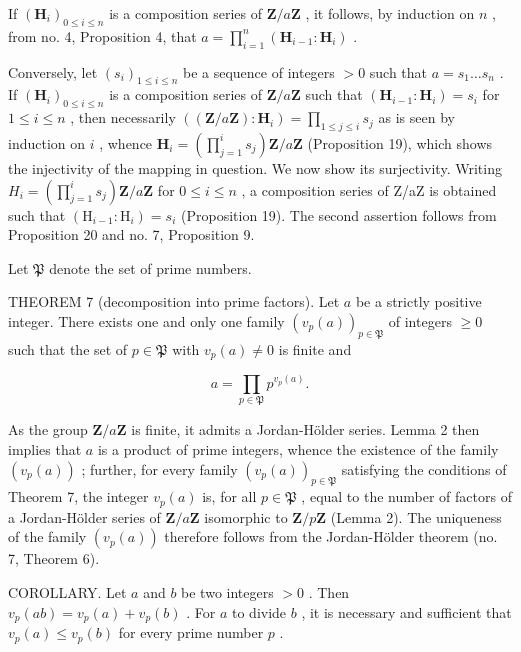 If \((\mathbf{H}_i)_{0\leqslant i\leqslant n}\) is a composition series of \(\mathbf{Z} / a\mathbf{Z}\) , it follows, by induction on \(n\) , from no. 4, Proposition 4, that \(a = \prod_{i=1}^{n} (\mathbf{H}_{i-1}:\mathbf{H}_i)\) .

Conversely, let \((s_i)_{1 \leqslant i \leqslant n}\) be a sequence of integers \(>0\) such that \(a = s_1 \ldots s_n\) . If \((\mathbf{H}_i)_{0 \leqslant i \leqslant n}\) is a composition series of \(\mathbf{Z} / a\mathbf{Z}\) such that \((\mathbf{H}_{i-1} : \mathbf{H}_i) = s_i\) for \(1 \leqslant i \leqslant n\) , then necessarily \(((\mathbf{Z} / a\mathbf{Z}) : \mathbf{H}_i) = \prod_{1 \leqslant j \leqslant i} s_j\) as is seen by induction on \(i\) , whence \(\mathbf{H}_i = \left( \prod_{j=1}^{i} s_j \right) \mathbf{Z} / a\mathbf{Z}\) (Proposition 19), which shows the injectivity of the mapping in question. We now show its surjectivity. Writing \(H_{i}=\left(\prod_{j=1}^{i}s_{j}\right)\mathbf{Z}/a\mathbf{Z}\) for \(0\leqslant i\leqslant n\) , a composition series of Z/aZ is obtained such that \((\mathrm{H}_{i-1}:\mathrm{H}_{i})=s_{i}\) (Proposition 19). The second assertion follows from Proposition 20 and no. 7, Proposition 9.

Let \(\mathfrak{P}\) denote the set of prime numbers.

THEOREM 7 (decomposition into prime factors). Let \(a\) be a strictly positive integer. There exists one and only one family \((v_{p}(a))_{p \in \mathfrak{P}}\) of integers \(\geqslant 0\) such that the set of \(p \in \mathfrak{P}\) with \(v_{p}(a) \neq 0\) is finite and

\[
a = \prod_ {p \in \mathfrak {P}} p ^ {v _ {p} (a)}.\tag{5}
\]

As the group \(\mathbf{Z}/a\mathbf{Z}\) is finite, it admits a Jordan-Hölder series. Lemma 2 then implies that \(a\) is a product of prime integers, whence the existence of the family \((v_{p}(a))\) ; further, for every family \((v_{p}(a))_{p\in\mathfrak{P}}\) satisfying the conditions of Theorem 7, the integer \(v_{p}(a)\) is, for all \(p\in\mathfrak{P}\) , equal to the number of factors of a Jordan-Hölder series of \(\mathbf{Z}/a\mathbf{Z}\) isomorphic to \(\mathbf{Z}/p\mathbf{Z}\) (Lemma 2). The uniqueness of the family \((v_{p}(a))\) therefore follows from the Jordan-Hölder theorem (no. 7, Theorem 6).

COROLLARY. Let \(a\) and \(b\) be two integers \(>0\) . Then \(v_{p}(ab) = v_{p}(a) + v_{p}(b)\) . For \(a\) to divide \(b\) , it is necessary and sufficient that \(v_{p}(a) \leqslant v_{p}(b)\) for every prime number \(p\) .

